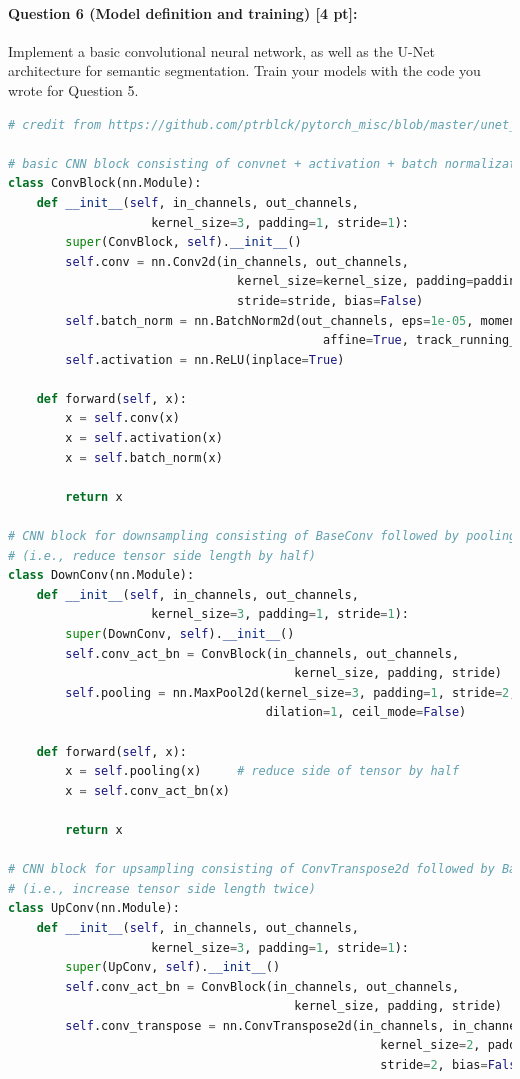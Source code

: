 \documentclass[11pt]{article}
\begin{document}
\paragraph{Question 6 (Model definition and training) [4 pt]:} 
Implement a basic convolutional neural network, as well as the U-Net architecture for semantic segmentation. Train your models with the code you wrote for Question 5. 

\begin{lstlisting}[language=Python, basicstyle=\scriptsize]
# credit from https://github.com/ptrblck/pytorch_misc/blob/master/unet_demo.py

# basic CNN block consisting of convnet + activation + batch normalization
class ConvBlock(nn.Module):
    def __init__(self, in_channels, out_channels, 
                    kernel_size=3, padding=1, stride=1):
        super(ConvBlock, self).__init__()
        self.conv = nn.Conv2d(in_channels, out_channels, 
                                kernel_size=kernel_size, padding=padding, 
                                stride=stride, bias=False)
        self.batch_norm = nn.BatchNorm2d(out_channels, eps=1e-05, momentum=0.1, 
                                            affine=True, track_running_stats=True)
        self.activation = nn.ReLU(inplace=True)
    
    def forward(self, x):
        x = self.conv(x)
        x = self.activation(x)
        x = self.batch_norm(x)
    
        return x

# CNN block for downsampling consisting of BaseConv followed by pooling 
# (i.e., reduce tensor side length by half)
class DownConv(nn.Module):
    def __init__(self, in_channels, out_channels, 
                    kernel_size=3, padding=1, stride=1):
        super(DownConv, self).__init__()
        self.conv_act_bn = ConvBlock(in_channels, out_channels, 
                                        kernel_size, padding, stride)
        self.pooling = nn.MaxPool2d(kernel_size=3, padding=1, stride=2, 
                                    dilation=1, ceil_mode=False)
        
    def forward(self, x):
        x = self.pooling(x)     # reduce side of tensor by half
        x = self.conv_act_bn(x)   

        return x

# CNN block for upsampling consisting of ConvTranspose2d followed by BaseConv 
# (i.e., increase tensor side length twice)
class UpConv(nn.Module):
    def __init__(self, in_channels, out_channels, 
                    kernel_size=3, padding=1, stride=1):
        super(UpConv, self).__init__()
        self.conv_act_bn = ConvBlock(in_channels, out_channels, 
                                        kernel_size, padding, stride)
        self.conv_transpose = nn.ConvTranspose2d(in_channels, in_channels, 
                                                    kernel_size=2, padding=0, 
                                                    stride=2, bias=False)
        

\end{lstlisting}
\end{document}
